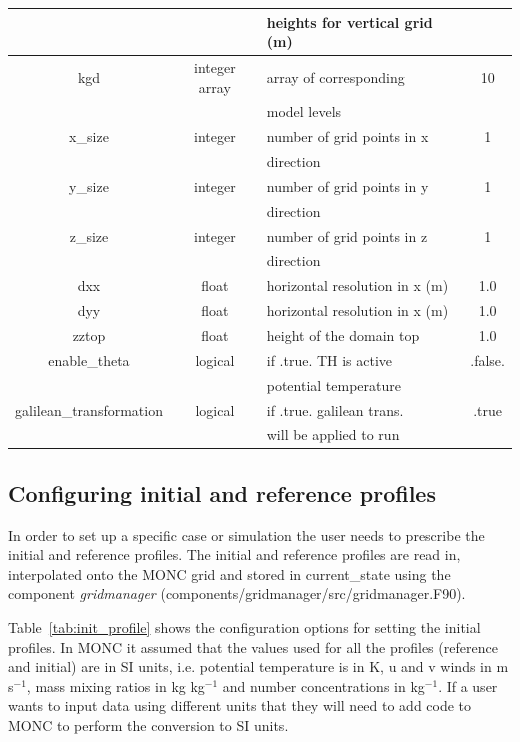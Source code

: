 \documentclass[a4paper,11pt]{article}
\begin{document}
\begin{table}[H]
\begin{tabular}{|c|c|l|c|}
   &  & heights for vertical grid (m) & \tabularnewline
 \hline
 kgd & integer array & array of corresponding  &  10 \tabularnewline
   &  & model levels & \tabularnewline
 \hline
 x\_size & integer &  number of grid points in x &  1\tabularnewline
   & & direction &  \tabularnewline
 \hline
 y\_size & integer &  number of grid points in y &  1 \tabularnewline
   & & direction &  \tabularnewline
 \hline
 z\_size & integer &  number of grid points in z & 1 \tabularnewline
   & & direction &  \tabularnewline
 \hline
 dxx & float &  horizontal resolution in x (m) & 1.0 \tabularnewline
 \hline
 dyy & float &  horizontal resolution in x (m) & 1.0 \tabularnewline
 \hline
 zztop & float &  height of the domain top & 1.0 \tabularnewline
 \hline
 enable\_theta & logical & if .true. TH is active & .false. \tabularnewline
   &  & potential temperature &  \tabularnewline
 \hline
 galilean\_transformation & logical & if .true. galilean trans. & .true \tabularnewline
   & & will be applied to run & \tabularnewline
\hline
\end{tabular}
\end{table}

\subsection{Configuring initial and reference profiles }

In order to set up a specific case or simulation the user needs to prescribe the initial
and reference profiles. The initial and reference profiles are read in, interpolated
onto the MONC grid and stored in current\_state using the component \emph{gridmanager}
(components/gridmanager/src/gridmanager.F90).

Table~\ref{tab:init_profile} shows the configuration options
for setting the initial profiles. In MONC it assumed that the values used for all the
profiles (reference and initial) are in SI units, i.e. potential temperature
is in K, u and v winds in m s$^{-1}$, mass mixing ratios in kg kg$^{-1}$ and
number concentrations in kg$^{-1}$. If a user wants to input data using different
units that they will need to add code to MONC to perform the conversion to
SI units.
\end{document}
